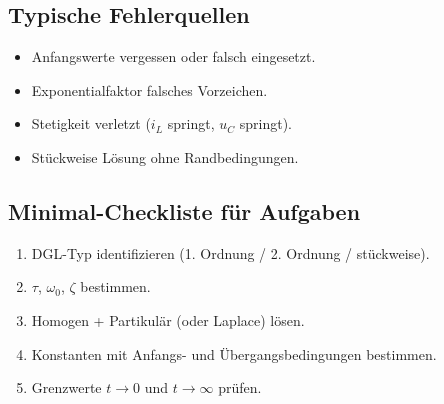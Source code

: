 \subsection{Typische Fehlerquellen}

\begin{itemize}
    \item Anfangswerte vergessen oder falsch eingesetzt.
    \item Exponentialfaktor falsches Vorzeichen.
    \item Stetigkeit verletzt ($i_L$ springt, $u_C$ springt).
    \item Stückweise Lösung ohne Randbedingungen.
\end{itemize}

\subsection{Minimal-Checkliste für Aufgaben}

\begin{enumerate}
    \item DGL-Typ identifizieren (1. Ordnung / 2. Ordnung / stückweise).
    \item $\tau$, $\omega_0$, $\zeta$ bestimmen.
    \item Homogen + Partikulär (oder Laplace) lösen.
    \item Konstanten mit Anfangs- und Übergangsbedingungen bestimmen.
    \item Grenzwerte $t\to 0$ und $t\to\infty$ prüfen.
\end{enumerate}
